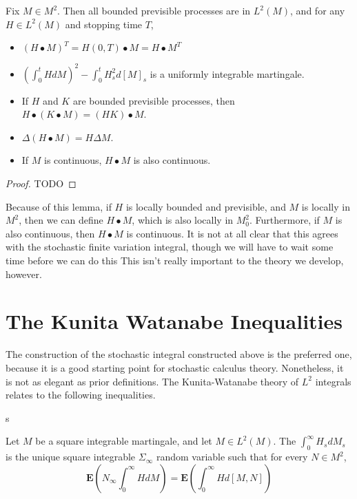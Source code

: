 \begin{theorem}
    Fix $M \in M^2$. Then all bounded previsible processes are in $L^2(M)$, and for any $H \in L^2(M)$ and stopping time $T$,
    \begin{itemize}
        \item $(H \bullet M)^T = H(0,T) \bullet M = H \bullet M^T$
        \item $\left( \int_0^t H dM \right)^2 - \int_0^t H_s^2 d[M]_s$ is a uniformly integrable martingale.
        \item If $H$ and $K$ are bounded previsible processes, then $H \bullet (K \bullet M) = (HK) \bullet M$.
        \item $\Delta(H \bullet M) = H \Delta M$.
        \item If $M$ is continuous, $H \bullet M$ is also continuous.
    \end{itemize}
\end{theorem}
\begin{proof}
    TODO
\end{proof}

Because of this lemma, if $H$ is locally bounded and previsible, and $M$ is locally in $M^2$, then we can define $H \bullet M$, which is also locally in $M^2_0$. Furthermore, if $M$ is also continuous, then $H \bullet M$ is continuous. It is not at all clear that this agrees with the stochastic finite variation integral, though we will have to wait some time before we can do this This isn't really important to the theory we develop, however.

\section{The Kunita Watanabe Inequalities}

The construction of the stochastic integral constructed above is the preferred one, because it is a good starting point for stochastic calculus theory. Nonetheless, it is not as elegant as prior definitions. The Kunita-Watanabe theory of $L^2$ integrals relates to the following inequalities.

\begin{theorem}
    s
\end{theorem}

\begin{theorem}
    Let $M$ be a square integrable martingale, and let $M \in L^2(M)$. The $\int_0^\infty H_s dM_s$ is the unique square integrable $\Sigma_\infty$ random variable such that for every $N \in M^2$,
    \[ \mathbf{E} \left( N_\infty \int_0^\infty H dM \right) = \mathbf{E} \left( \int_0^\infty H d[M,N] \right) \]
\end{theorem}







